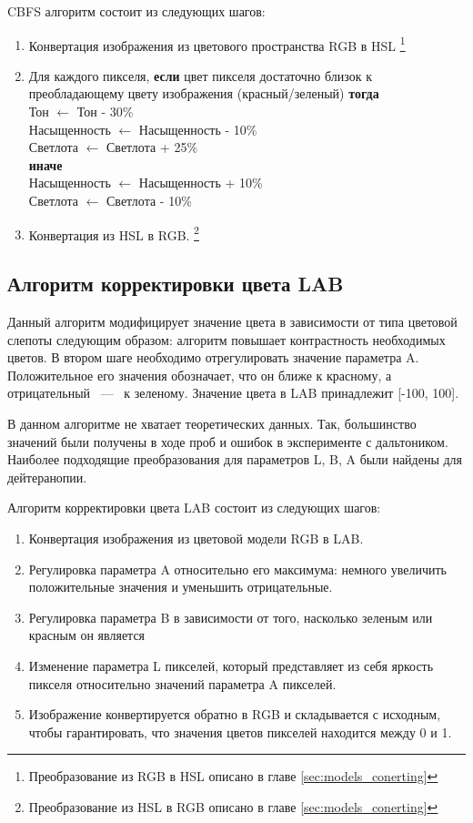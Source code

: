 \documentclass[a4paper,14pt, unknownkeysallowed]{extreport}
\begin{document}
    CBFS алгоритм состоит из следующих шагов:
    \begin{enumerate}
        \item Конвертация изображения из цветового пространства RGB в HSL \footnote{Преобразование из RGB в HSL описано в главе \ref{sec:models_conerting}}
        \item Для каждого пикселя, \textbf{если} цвет пикселя достаточно близок к преобладающему цвету изображения (красный/зеленый) \textbf{тогда} \\
            Тон $\leftarrow$ Тон - 30\% \\
            Насыщенность $\leftarrow$ Насыщенность - 10\% \\
            Светлота $\leftarrow$ Светлота + 25\% \\
        \textbf{иначе} \\
            Насыщенность $\leftarrow$ Насыщенность + 10\% \\
            Светлота $\leftarrow$ Светлота - 10\% \\
        \item Конвертация из HSL в RGB. \footnote{Преобразование из HSL в RGB описано в главе \ref{sec:models_conerting}}
    \end{enumerate}

    \subsection{Алгоритм корректировки цвета LAB}

    Данный алгоритм модифицирует значение цвета в зависимости от типа цветовой слепоты следующим образом: алгоритм повышает контрастность необходимых цветов. В втором шаге необходимо отрегулировать значение параметра A. Положительное его значения обозначает, что он ближе к красному, а отрицательный ~---~ к зеленому. Значение цвета в LAB принадлежит [-100, 100]. 
    
    В данном алгоритме не хватает теоретических данных. Так, большинство значений были получены в ходе проб и ошибок в эксперименте с дальтоником. Наиболее подходящие преобразования для параметров L, B, A были найдены для дейтеранопии.

    Алгоритм корректировки цвета LAB состоит из следующих шагов: 
    \begin{enumerate}
        \item Конвертация изображения из цветовой модели RGB в LAB.
        \item Регулировка параметра A относительно его максимума: немного увеличить положительные значения и уменьшить отрицательные.
        \item Регулировка параметра B в зависимости от того, насколько зеленым или красным он является
        \item Изменение параметра L пикселей, который представляет из себя яркость пикселя относительно значений параметра A пикселей.
        \item Изображение конвертируется обратно в RGB и складывается с исходным, чтобы гарантировать, что значения цветов пикселей находится между 0 и 1.
    \end{enumerate}
\end{document}
